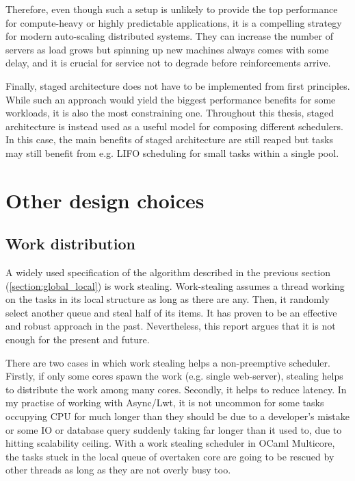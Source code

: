 \documentclass[12pt,a4paper,twoside]{report}
\begin{document}
Therefore, even though such a setup is unlikely to provide the top performance for compute-heavy or highly predictable applications, it is a compelling strategy for modern auto-scaling distributed systems. They can increase the number of servers as load grows but spinning up new machines always comes with some delay, and it is crucial for service not to degrade before reinforcements arrive.

\label{section:staged-as-composition}
Finally, staged architecture does not have to be implemented from first principles. While such an approach would yield the biggest performance benefits for some workloads, it is also the most constraining one. Throughout this thesis, staged architecture is instead used as a useful model for composing different schedulers. In this case, the main benefits of staged architecture are still reaped but tasks may still benefit from e.g. LIFO scheduling for small tasks within a single pool. 



\section{Other design choices}


\subsection{Work distribution}
\label{section:work-distribution}
A widely used specification of the algorithm described in the previous section (\ref{section:global_local}) is work stealing. Work-stealing assumes a thread working on the tasks in its local structure as long as there are any. Then, it randomly select another queue and steal half of its items. It has proven to be an effective and robust approach in the past. Nevertheless, this report argues that it is not enough for the present and future. 

There are two cases in which work stealing helps a non-preemptive scheduler. Firstly, if only some cores spawn the work (e.g. single web-server), stealing helps to distribute the work among many cores. Secondly, it helps to reduce latency. In my practise of working with Async/Lwt, it is not uncommon for some tasks occupying CPU for much longer than they should be due to a developer's mistake or some IO or database query suddenly taking far longer than it used to, due to hitting scalability ceiling. With a work stealing scheduler in OCaml Multicore, the tasks stuck in the local queue of overtaken core are going to be rescued by other threads as long as they are not overly busy too. 
\end{document}
